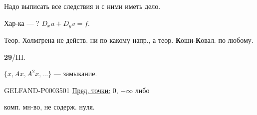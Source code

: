 Надо выписать все следствия и с ними иметь дело.
\begin{center}\end{center}
Хар-ка --- ? $D_xu+D_yv=f$.

Теор. Холмгрена не действ. ни по какому напр., а теор.
\textbf{К}оши-\textbf{К}овал. по любому.


\textbf{29}/III.\qquad{}


$\{x,Ax,A^2x,\ldots\}$ --- замыкание.

\begin{GelfandAdjacentEvidence}{GELFAND-P000350}{1}
\uline{Пред. точки:} $0$, $+\infty$ либо
\end{GelfandAdjacentEvidence}

комп. мн-во, не содерж. нуля.

